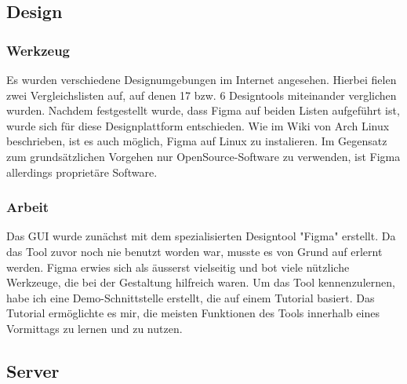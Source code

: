 \subsection{Design}
\subsubsection{Werkzeug}
Es wurden verschiedene Designumgebungen im Internet angesehen. Hierbei fielen zwei Vergleichslisten \cite{figma-entschied-1}\cite{figma-entschied-2} auf, auf denen 17 bzw. 6 Designtools miteinander verglichen wurden. Nachdem festgestellt wurde, dass Figma auf beiden Listen aufgeführt ist, wurde sich für diese Designplattform entschieden.
Wie im Wiki von Arch Linux \cite{figma-linux} beschrieben, ist es auch möglich, Figma auf Linux zu instalieren. Im Gegensatz zum grundsätzlichen Vorgehen nur OpenSource-Software zu verwenden, ist Figma allerdings proprietäre Software. 
\subsubsection{Arbeit}
Das GUI wurde zunächst mit dem spezialisierten Designtool "Figma" erstellt. Da das Tool zuvor noch nie benutzt worden war, musste es von Grund auf erlernt werden. Figma erwies sich als äusserst vielseitig und bot viele nützliche Werkzeuge, die bei der Gestaltung hilfreich waren.
Um das Tool kennenzulernen, habe ich eine Demo-Schnittstelle erstellt, die auf einem Tutorial \cite{figma-tutorial} basiert. Das Tutorial ermöglichte es mir, die meisten Funktionen des Tools innerhalb eines Vormittags zu lernen und zu nutzen. 
\subsection{Server}
